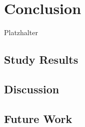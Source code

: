 \section{Conclusion}
Platzhalter\\

\subsection{Study Results}
\subsection{Discussion}
\subsection{Future Work} 




\newpage
